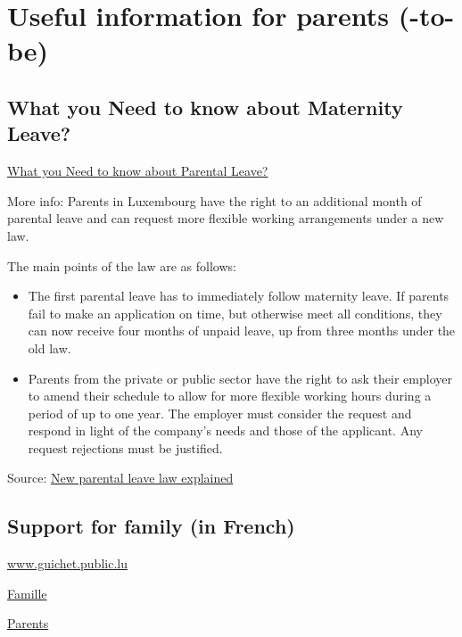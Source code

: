 \section{Useful information for parents (-to-be)}

\subsection{What you Need to know about Maternity Leave?}

\href{http://wwwen.uni.lu/university_newsletter/newsletter_system/hr_spotlight/hr_spotlight_all_you_need_to_know_about_maternity_and_parental_leave/what_you_need_to_know_about_parental_leave}{What you Need to know about Parental Leave?}

More info:
Parents in Luxembourg have the right to an additional month of parental leave and can request more flexible working arrangements under a new law.
 
The main points of the law are as follows:
\begin{itemize}
	\item The first parental leave has to immediately follow maternity leave. If parents fail to make an application on time, but otherwise meet all conditions, they can now receive four months of unpaid leave, up from three months under the old law.
	\item Parents from the private or public sector have the right to ask their employer to amend their schedule to allow for more flexible working hours during a period of up to one year. The employer must consider the request and respond in light of the company's needs and those of the applicant. Any request rejections must be justified.
\end{itemize}

Source: \href{http://www.wort.lu/en/view/new-parental-leave-law-explained-51935346e4b0889d25ec2b91}{New parental leave law explained}
 
\subsection{Support for family (in French)}

\noindent \href{http://www.guichet.public.lu/citoyens/fr/index.html}{www.guichet.public.lu}
 
\noindent \href{http://www.guichet.public.lu/citoyens/fr/famille/index.html}{Famille}
 
\noindent \href{http://www.guichet.public.lu/citoyens/fr/famille/parents/index.html}{Parents}


